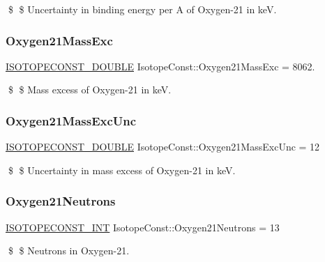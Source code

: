 \$ \$ Uncertainty in binding energy per A of Oxygen-\/21 in keV. \mbox{\label{group___isotope_const-_oxygen-_o21_ga873f5f0132d932406a43f0c7a16f4e9a}} 
\subsubsection{\texorpdfstring{Oxygen21\+Mass\+Exc}{Oxygen21MassExc}}
{\footnotesize\ttfamily \mbox{\hyperlink{group___isotope_const-_macros_ga8f45a7272ce02c0b4c65c44636ed719a}{I\+S\+O\+T\+O\+P\+E\+C\+O\+N\+S\+T\+\_\+\+D\+O\+U\+B\+LE}} Isotope\+Const\+::\+Oxygen21\+Mass\+Exc = 8062.}

\$ \$ Mass excess of Oxygen-\/21 in keV. \mbox{\label{group___isotope_const-_oxygen-_o21_ga5a7a063222ac3faeb05cc721a03fd5ba}} 
\subsubsection{\texorpdfstring{Oxygen21\+Mass\+Exc\+Unc}{Oxygen21MassExcUnc}}
{\footnotesize\ttfamily \mbox{\hyperlink{group___isotope_const-_macros_ga8f45a7272ce02c0b4c65c44636ed719a}{I\+S\+O\+T\+O\+P\+E\+C\+O\+N\+S\+T\+\_\+\+D\+O\+U\+B\+LE}} Isotope\+Const\+::\+Oxygen21\+Mass\+Exc\+Unc = 12}

\$ \$ Uncertainty in mass excess of Oxygen-\/21 in keV. \mbox{\label{group___isotope_const-_oxygen-_o21_gab0dee11a43f17c7bcddeb9e2bdf38b80}} 
\subsubsection{\texorpdfstring{Oxygen21\+Neutrons}{Oxygen21Neutrons}}
{\footnotesize\ttfamily \mbox{\hyperlink{group___isotope_const-_macros_ga5f18360b3e99483a35c32d789e62621c}{I\+S\+O\+T\+O\+P\+E\+C\+O\+N\+S\+T\+\_\+\+I\+NT}} Isotope\+Const\+::\+Oxygen21\+Neutrons = 13}

\$ \$ Neutrons in Oxygen-\/21. \mbox{\label{group___isotope_const-_oxygen-_o21_gafee01e0f0281fb98bcd6e4bbba6518de}} 

